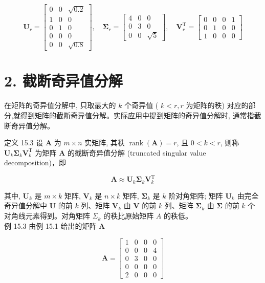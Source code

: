 \documentclass[10pt]{article}
\begin{document}
$$
\boldsymbol{U}_{r}=\left[\begin{array}{ccc}
0 & 0 & \sqrt{0.2} \\
1 & 0 & 0 \\
0 & 1 & 0 \\
0 & 0 & 0 \\
0 & 0 & \sqrt{0.8}
\end{array}\right], \quad \boldsymbol{\Sigma}_{r}=\left[\begin{array}{ccc}
4 & 0 & 0 \\
0 & 3 & 0 \\
0 & 0 & \sqrt{5}
\end{array}\right], \quad \boldsymbol{V}_{r}^{\mathrm{T}}=\left[\begin{array}{cccc}
0 & 0 & 0 & 1 \\
0 & 1 & 0 & 0 \\
1 & 0 & 0 & 0
\end{array}\right]
$$

\section*{2. 截断奇异值分解}
在矩阵的奇异值分解中, 只取最大的 $k$ 个奇异值 ( $k<r, r$ 为矩阵的秩) 对应的部分,就得到矩阵的截断奇异值分解。实际应用中提到矩阵的奇异值分解时, 通常指截断奇异值分解。

定义 15.3 设 $\boldsymbol{A}$ 为 $m \times n$ 实矩阵, 其秩 $\operatorname{rank}(\boldsymbol{A})=r$, 且 $0<k<r$, 则称 $\boldsymbol{U}_{k} \boldsymbol{\Sigma}_{k} \boldsymbol{V}_{k}^{\mathrm{T}}$ 为矩阵 $\boldsymbol{A}$ 的截断奇异值分解 (truncated singular value decomposition)，即


\begin{equation*}
\boldsymbol{A} \approx \boldsymbol{U}_{k} \boldsymbol{\Sigma}_{k} \boldsymbol{V}_{k}^{\mathrm{T}} \tag{15.19}
\end{equation*}


其中, $\boldsymbol{U}_{k}$ 是 $m \times k$ 矩阵, $\boldsymbol{V}_{k}$ 是 $n \times k$ 矩阵, $\boldsymbol{\Sigma}_{k}$ 是 $k$ 阶对角矩阵; 矩阵 $\boldsymbol{U}_{k}$ 由完全奇异值分解中 $\boldsymbol{U}$ 的前 $k$ 列、矩阵 $\boldsymbol{V}_{k}$ 由 $\boldsymbol{V}$ 的前 $k$ 列、矩阵 $\boldsymbol{\Sigma}_{k}$ 由 $\boldsymbol{\Sigma}$ 的前 $k$ 个对角线元素得到。对角矩阵 $\Sigma_{k}$ 的秩比原始矩阵 $A$ 的秩低。\\
例 15.3 由例 15.1 给出的矩阵 $\boldsymbol{A}$

$$
\boldsymbol{A}=\left[\begin{array}{llll}
1 & 0 & 0 & 0 \\
0 & 0 & 0 & 4 \\
0 & 3 & 0 & 0 \\
0 & 0 & 0 & 0 \\
2 & 0 & 0 & 0
\end{array}\right]
$$
\end{document}
